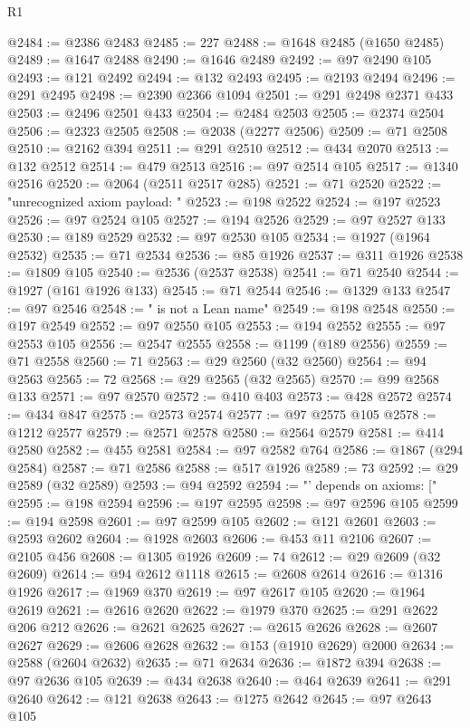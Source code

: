 \begin{lexlean}{R1}
\begin{coremodule}
{{{{{{{{{{{{{{{{{{{{{{{{{{{{{{{{{{{{{{{{{{{{{{{{{{{{{{{{{{{{{{{{{{{{{{{{{{{{{{{{{{{{{{{{{{{{{{{{{{{{{{{{{{{{{{{{{{{{{{{{{{{{{{{{{{{{{{{{{{{{{{{{{{{{{{{{{{{{{{{{{{{{{{{{{{{{{{{{{{{{{{{{{{@2484 := @2386 @2483
@2485 := 227
@2488 := @1648 @2485 (@1650 @2485)
@2489 := @1647 @2488
@2490 := @1646 @2489
@2492 := @97 @2490 @105
@2493 := @121 @2492
@2494 := @132 @2493
@2495 := @2193 @2494
@2496 := @291 @2495
@2498 := @2390 @2366 @1094
@2501 := @291 @2498 @2371 @433
@2503 := @2496 @2501 @433
@2504 := @2484 @2503
@2505 := @2374 @2504
@2506 := @2323 @2505
@2508 := @2038 (@2277 @2506)
@2509 := @71 @2508
@2510 := @2162 @394
@2511 := @291 @2510
@2512 := @434 @2070
@2513 := @132 @2512
@2514 := @479 @2513
@2516 := @97 @2514 @105
@2517 := @1340 @2516
@2520 := @2064 (@2511 @2517 @285)
@2521 := @71 @2520
@2522 := "unrecognized axiom payload: "
@2523 := @198 @2522
@2524 := @197 @2523
@2526 := @97 @2524 @105
@2527 := @194 @2526
@2529 := @97 @2527 @133
@2530 := @189 @2529
@2532 := @97 @2530 @105
@2534 := @1927 (@1964 @2532)
@2535 := @71 @2534
@2536 := @85 @1926
@2537 := @311 @1926
@2538 := @1809 @105
@2540 := @2536 (@2537 @2538)
@2541 := @71 @2540
@2544 := @1927 (@161 @1926 @133)
@2545 := @71 @2544
@2546 := @1329 @133
@2547 := @97 @2546
@2548 := " is not a Lean name"
@2549 := @198 @2548
@2550 := @197 @2549
@2552 := @97 @2550 @105
@2553 := @194 @2552
@2555 := @97 @2553 @105
@2556 := @2547 @2555
@2558 := @1199 (@189 @2556)
@2559 := @71 @2558
@2560 := 71
@2563 := @29 @2560 (@32 @2560)
@2564 := @94 @2563
@2565 := 72
@2568 := @29 @2565 (@32 @2565)
@2570 := @99 @2568 @133
@2571 := @97 @2570
@2572 := @410 @403
@2573 := @428 @2572
@2574 := @434 @847
@2575 := @2573 @2574
@2577 := @97 @2575 @105
@2578 := @1212 @2577
@2579 := @2571 @2578
@2580 := @2564 @2579
@2581 := @414 @2580
@2582 := @455 @2581
@2584 := @97 @2582 @764
@2586 := @1867 (@294 @2584)
@2587 := @71 @2586
@2588 := @517 @1926
@2589 := 73
@2592 := @29 @2589 (@32 @2589)
@2593 := @94 @2592
@2594 := "' depends on axioms: ["
@2595 := @198 @2594
@2596 := @197 @2595
@2598 := @97 @2596 @105
@2599 := @194 @2598
@2601 := @97 @2599 @105
@2602 := @121 @2601
@2603 := @2593 @2602
@2604 := @1928 @2603
@2606 := @453 @11 @2106
@2607 := @2105 @456
@2608 := @1305 @1926
@2609 := 74
@2612 := @29 @2609 (@32 @2609)
@2614 := @94 @2612 @1118
@2615 := @2608 @2614
@2616 := @1316 @1926
@2617 := @1969 @370
@2619 := @97 @2617 @105
@2620 := @1964 @2619
@2621 := @2616 @2620
@2622 := @1979 @370
@2625 := @291 @2622 @206 @212
@2626 := @2621 @2625
@2627 := @2615 @2626
@2628 := @2607 @2627
@2629 := @2606 @2628
@2632 := @153 (@1910 @2629) @2000
@2634 := @2588 (@2604 @2632)
@2635 := @71 @2634
@2636 := @1872 @394
@2638 := @97 @2636 @105
@2639 := @434 @2638
@2640 := @464 @2639
@2641 := @291 @2640
@2642 := @121 @2638
@2643 := @1275 @2642
@2645 := @97 @2643 @105
}}}}}}}}}}}}}}}}}}}}}}}}}}}}}}}}}}}}}}}}}}}}}}}}}}}}}}}}}}}}}}}}}}}}}}}}}}}}}}}}}}}}}}}}}}}}}}}}}}}}}}}}}}}}}}}}}}}}}}}}}}}}}}}}}}}}}}}}}}}}}}}}}}}}}}}}}}}}}}}}}}}}}}}}}}}}}}}}}}}}}}}}}}
\end{coremodule}
\end{lexlean}

